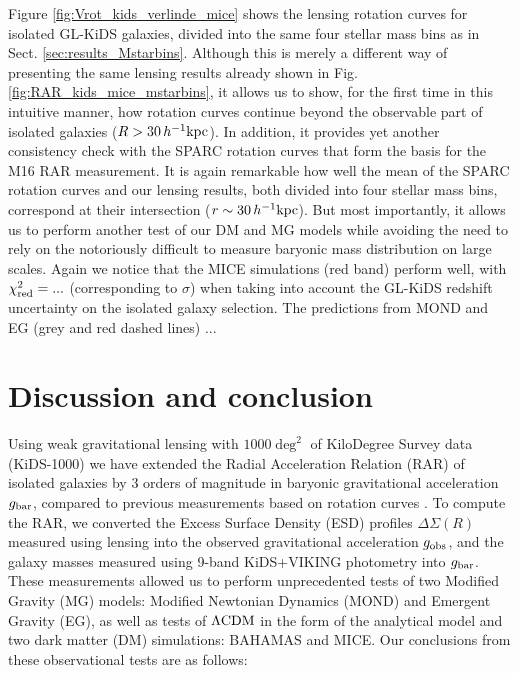 \documentclass[usenatbib]{mnras}
\newcommand{\hkpc}{\, h^{-1}{\rm{kpc}} }
\newcommand{\lcdm}{{\rm \Lambda CDM}}
\newcommand{\un}[1]{_{\rm #1}}
\begin{document}
Figure \ref{fig:Vrot_kids_verlinde_mice} shows the lensing rotation curves for isolated GL-KiDS galaxies, divided into the same four stellar mass bins as in Sect. \ref{sec:results_Mstarbins}. Although this is merely a different way of presenting the same lensing results already shown in Fig. \ref{fig:RAR_kids_mice_mstarbins}, it allows us to show, for the first time in this intuitive manner, how rotation curves continue beyond the observable part of isolated galaxies ($R>30\hkpc$). In addition, it provides yet another consistency check with the SPARC rotation curves \cite[]{lelli2016b} that form the basis for the M16 RAR measurement. It is again remarkable how well the mean of the SPARC rotation curves and our lensing results, both divided into four stellar mass bins, correspond at their intersection ($r\sim 30 \hkpc$). But most importantly, it allows us to perform another test of our DM and MG models while avoiding the need to rely on the notoriously difficult to measure baryonic mass distribution on large scales. Again we notice that the MICE simulations (red band) perform well, with $\chi\un{red}^2 = ...$ (corresponding to $\sigma$) when taking into account the GL-KiDS redshift uncertainty on the isolated galaxy selection. The predictions from MOND and EG (grey and red dashed lines) ...

\section{Discussion and conclusion}
\label{sec:discon}

Using weak gravitational lensing with $1000 \deg^2$ of KiloDegree Survey data (KiDS-1000) we have extended the Radial Acceleration Relation (RAR) of isolated galaxies by $3$ orders of magnitude in baryonic gravitational acceleration $g\un{bar}$, compared to previous measurements based on rotation curves \cite[most notably][M16]{mcgaugh2016}. To compute the RAR, we converted the Excess Surface Density (ESD) profiles $\Delta\Sigma(R)$ measured using lensing into the observed gravitational acceleration $g\un{obs}$, and the galaxy masses measured using 9-band KiDS+VIKING photometry into $g\un{bar}$. These measurements allowed us to perform unprecedented tests of two Modified Gravity (MG) models: Modified Newtonian Dynamics (MOND) and Emergent Gravity (EG), as well as tests of $\lcdm$ in the form of the \cite[][N17]{navarro2017} analytical model and two dark matter (DM) simulations: BAHAMAS and MICE. Our conclusions from these observational tests are as follows:
\end{document}
